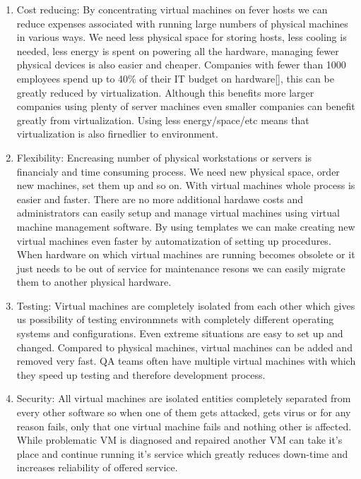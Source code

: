 \begin{itemize}
\begin{enumerate}
\item Cost reducing: By concentrating virtual machines on fever hosts we can reduce expenses associated with running large numbers of physical machines in various ways. We need less physical space for storing hosts, less cooling is needed, less energy is spent on powering all the hardware, managing fewer physical devices is also easier and cheaper. Companies with fewer than 1000 employees spend up to 40\% of their IT budget on hardware[], this can be greatly reduced by virtualization. Although this benefits more larger companies using plenty of server machines even smaller companies can benefit greatly from virtualization. Using less energy/space/etc means that virtualization is also firnedlier to environment.

\item Flexibility: Encreasing number of physical workstations or servers is financialy and time consuming process. We need new physical space, order new machines, set them up and so on. With virtual machines whole process is easier and faster. There are no more additional hardawe costs and administrators can easily setup and manage virtual machines using virtual machine management software. By using templates we can make creating new virtual machines even faster by automatization of setting up procedures. When hardware on which virtual machines are running becomes obsolete or it just needs to be out of service for maintenance resons we can easily migrate them to another physical hardware.

\item Testing: Virtual machines are completely isolated from each other which gives us possibility of testing environmnets with completely different operating systems and configurations. Even extreme situations are easy to set up and changed. Compared to physical machines, virtual machines can be added and removed very fast. QA teams often have multiple virtual machines with which they speed up testing and therefore development process.

\item Security: All virtual machines are isolated entities completely separated from every other software so when one of them gets attacked, gets virus or for any reason fails, only that one virtual machine fails and nothing other is affected. While problematic VM is diagnosed and repaired another VM can take it's place and continue running it's service which greatly reduces down-time and increases reliability of offered service.


\end{enumerate}
\end{itemize}
